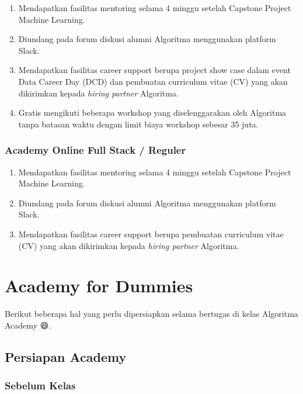 \documentclass[
]{book}
\providecommand{\tightlist}{%
  \setlength{\itemsep}{0pt}\setlength{\parskip}{0pt}}
\begin{document}
\begin{enumerate}
\def\labelenumi{\arabic{enumi}.}
\tightlist
\item
  Mendapatkan fasilitas mentoring selama 4 minggu setelah Capstone Project Machine Learning.
\item
  Diundang pada forum diskusi alumni Algoritma menggunakan platform Slack.
\item
  Mendapatkan fasilitas career support berupa project show case dalam event Data Career Day (DCD) dan pembuatan curriculum vitae (CV) yang akan dikirimkan kepada \emph{hiring partner} Algoritma.
\item
  Gratis mengikuti beberapa workshop yang diselenggarakan oleh Algoritma tanpa batasan waktu dengan limit biaya workshop sebesar 35 juta.
\end{enumerate}

\hypertarget{academy-online-full-stack-reguler}{%
\subsection{Academy Online Full Stack / Reguler}\label{academy-online-full-stack-reguler}}

\begin{enumerate}
\def\labelenumi{\arabic{enumi}.}
\tightlist
\item
  Mendapatkan fasilitas mentoring selama 4 minggu setelah Capstone Project Machine Learning.
\item
  Diundang pada forum diskusi alumni Algoritma menggunakan platform Slack.
\item
  Mendapatkan fasilitas career support berupa pembuatan curriculum vitae (CV) yang akan dikirimkan kepada \emph{hiring partner} Algoritma.
\end{enumerate}

\hypertarget{academy-for-dummies}{%
\chapter{Academy for Dummies}\label{academy-for-dummies}}

Berikut beberapa hal yang perlu dipersiapkan selama bertugas di kelas Algoritma Academy 😄.

\hypertarget{persiapan-academy}{%
\section{Persiapan Academy}\label{persiapan-academy}}

\hypertarget{sebelum-kelas}{%
\subsection{Sebelum Kelas}\label{sebelum-kelas}}
\end{document}
